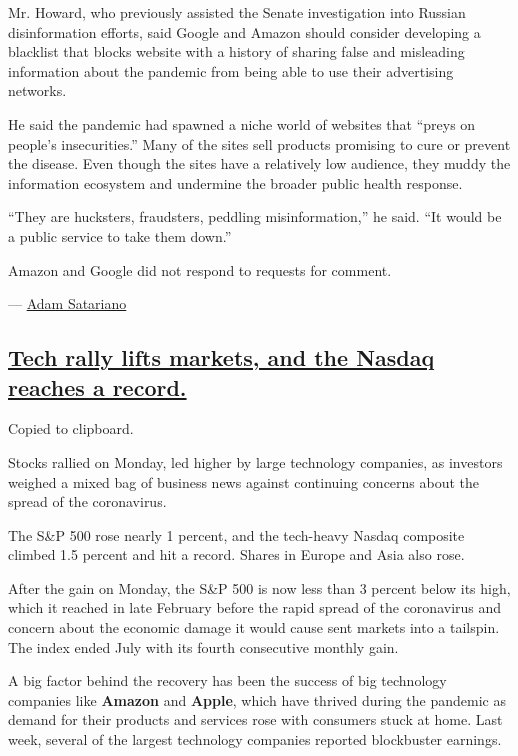 Mr. Howard, who previously assisted the Senate investigation into
Russian disinformation efforts, said Google and Amazon should consider
developing a blacklist that blocks website with a history of sharing
false and misleading information about the pandemic from being able to
use their advertising networks.

He said the pandemic had spawned a niche world of websites that ``preys
on people's insecurities.'' Many of the sites sell products promising to
cure or prevent the disease. Even though the sites have a relatively low
audience, they muddy the information ecosystem and undermine the broader
public health response.

``They are hucksters, fraudsters, peddling misinformation,'' he said.
``It would be a public service to take them down.''

Amazon and Google did not respond to requests for comment.

--- \href{https://www.nytimes.com/by/adam-satariano}{Adam Satariano}

\hypertarget{tech-rally-lifts-markets-and-the-nasdaq-reaches-a-record}{%
\subsection{\texorpdfstring{\protect\hyperlink{tech-rally-lifts-markets-and-the-nasdaq-reaches-a-record}{Tech
rally lifts markets, and the Nasdaq reaches a
record.}}{Tech rally lifts markets, and the Nasdaq reaches a record.}}\label{tech-rally-lifts-markets-and-the-nasdaq-reaches-a-record}}

Copied to clipboard.

Stocks rallied on Monday, led higher by large technology companies, as
investors weighed a mixed bag of business news against continuing
concerns about the spread of the coronavirus.

The S\&P 500 rose nearly 1 percent, and the tech-heavy Nasdaq composite
climbed 1.5 percent and hit a record. Shares in Europe and Asia also
rose.

After the gain on Monday, the S\&P 500 is now less than 3 percent below
its high, which it reached in late February before the rapid spread of
the coronavirus and concern about the economic damage it would cause
sent markets into a tailspin. The index ended July with its fourth
consecutive monthly gain.

A big factor behind the recovery has been the success of big technology
companies like \textbf{Amazon} and \textbf{Apple}, which have thrived
during the pandemic as demand for their products and services rose with
consumers stuck at home. Last week, several of the largest technology
companies reported blockbuster earnings.

